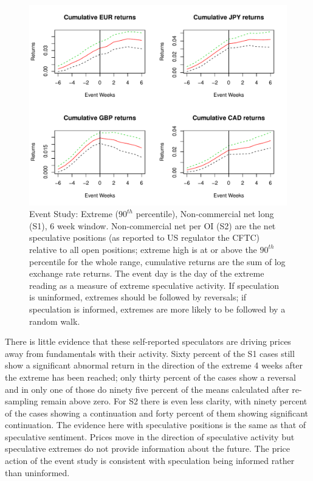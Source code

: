 \documentclass{article}
\begin{document}
\begin{figure}
\graphicspath{{../Figures/}}
\centering
\includegraphics[scale=0.8]{FPCum6wa}
\caption{Event Study:  Extreme ($90^{th}$ percentile), Non-commercial net long (S1), 6 week window. Non-commercial net per OI (S2) are the net speculative positions (as reported to US regulator the CFTC) relative to all open positions; extreme high is at or above the $90^{th}$ percentile for the whole range, cumulative returns are the sum of log exchange rate returns. The event day is the day of the extreme reading as a measure of extreme speculative activity.  If speculation is uninformed, extremes should be followed by reversals; if speculation is informed, extremes are more likely to be followed by a random walk.}
\label{fig:ES4}
\end{figure}

There is little evidence that these self-reported speculators are driving prices away from fundamentals with their activity. Sixty percent of the S1 cases still show a significant abnormal return in the direction of the extreme 4 weeks after the extreme has been reached; only thirty percent of the cases show a reversal and in only one of those do ninety five percent of the means calculated after re-sampling remain above zero.  For S2 there is even less clarity, with ninety percent of the cases showing a continuation and forty percent of them showing significant continuation.  The evidence here with speculative positions is the same as that of speculative sentiment.  Prices move in the direction of speculative activity but speculative extremes do not provide information about the future. The price action of the event study is consistent with speculation being informed rather than uninformed.     
\end{document}
